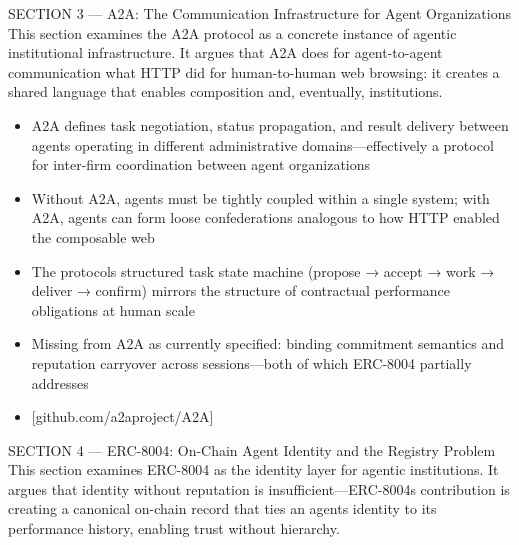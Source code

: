 \documentclass[
]{article}
\providecommand{\tightlist}{%
  \setlength{\itemsep}{0pt}\setlength{\parskip}{0pt}}
\begin{document}
SECTION 3 --- A2A: The Communication Infrastructure for Agent
Organizations This section examines the A2A protocol as a concrete
instance of agentic institutional infrastructure. It argues that A2A
does for agent-to-agent communication what HTTP did for human-to-human
web browsing: it creates a shared language that enables composition and,
eventually, institutions.

\begin{itemize}
\tightlist
\item
  A2A defines task negotiation, status propagation, and result delivery
  between agents operating in different administrative
  domains---effectively a protocol for inter-firm coordination between
  agent organizations
\item
  Without A2A, agents must be tightly coupled within a single system;
  with A2A, agents can form loose confederations analogous to how HTTP
  enabled the composable web
\item
  The protocol\textquotesingle s structured task state machine (propose
  → accept → work → deliver → confirm) mirrors the structure of
  contractual performance obligations at human scale
\item
  Missing from A2A as currently specified: binding commitment semantics
  and reputation carryover across sessions---both of which ERC-8004
  partially addresses
\item
  {[}github.com/a2aproject/A2A{]}
\end{itemize}

SECTION 4 --- ERC-8004: On-Chain Agent Identity and the Registry Problem
This section examines ERC-8004 as the identity layer for agentic
institutions. It argues that identity without reputation is
insufficient---ERC-8004\textquotesingle s contribution is creating a
canonical on-chain record that ties an agent\textquotesingle s identity
to its performance history, enabling trust without hierarchy.
\end{document}
